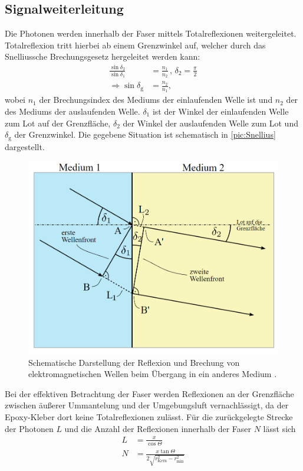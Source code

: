 \subsection{Signalweiterleitung}

Die Photonen werden innerhalb der Faser mittels Totalreflexionen weitergeleitet. Totalreflexion
tritt hierbei ab einem Grenzwinkel auf, welcher durch das Snelliussche Brechungsgesetz hergeleitet werden kann:
\begin{align}
    \label{eq:Snellius}
    \frac{\sin{\delta_2}}{\sin{\delta_1}} &= \frac{n_1}{n_2} \, , \, \delta_2 = \frac{\pi}{2} \\
    \Rightarrow \sin{\delta_{\text{g}}} &= \frac{n_2}{n_1},
\end{align}
wobei $n_1$ der Brechungsindex des Mediums der einlaufenden Welle ist und $n_2$ der des Mediums der auslaufenden
Welle. $\delta_1$ ist der Winkel der einlaufenden Welle zum Lot auf der Grenzfläche, $\delta_2$ der Winkel der auslaufenden
Welle zum Lot und $\delta_{\text{g}}$ der Grenzwinkel. Die gegebene Situation ist schematisch in \autoref{pic:Snellius} dargestellt.\\
\begin{figure}
    \centering
    \includegraphics[width = .5\textwidth]{content/pics/Snellius.png}
    \caption{Schematische Darstellung der Reflexion und Brechung von elektromagnetischen Wellen beim Übergang in ein anderes Medium \cite{Snellius}.}
    \label{pic:Snellius}
\end{figure}
Bei der effektiven Betrachtung der Faser werden Reflexionen an der Grenzfläche zwischen äußerer Ummantelung und der Umgebungsluft vernachlässigt, da der
Epoxy-Kleber dort keine Totalreflexionen zulässt. Für die zurückgelegte Strecke der Photonen $L$ und die Anzahl der Reflexionen innerhalb
der Faser $N$ lässt sich
\begin{align}
    \label{eq:rel}
    L &= \frac{x}{\cos{\Theta}}\\
    N &= \frac{x \tan{\Theta}}{2 \sqrt{r^2_{\text{Kern}} - r^2_{\text{min}}}} \label{eq:N}
\end{align}

